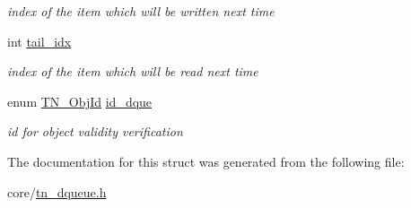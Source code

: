 \begin{DoxyCompactItemize}
\begin{DoxyCompactList}\small\item\em index of the item which will be written next time \end{DoxyCompactList}\item 
\hypertarget{structTN__DQueue_ab5451b7c143d4208c36d4227b79732a0}{int \hyperlink{structTN__DQueue_ab5451b7c143d4208c36d4227b79732a0}{tail\+\_\+idx}}\label{structTN__DQueue_ab5451b7c143d4208c36d4227b79732a0}

\begin{DoxyCompactList}\small\item\em index of the item which will be read next time \end{DoxyCompactList}\item 
\hypertarget{structTN__DQueue_afce2b73b8afc3b1537e34ff3a4a7114c}{enum \hyperlink{tn__common_8h_ae779dd1f6735f6e139fb70acd004d976}{T\+N\+\_\+\+Obj\+Id} \hyperlink{structTN__DQueue_afce2b73b8afc3b1537e34ff3a4a7114c}{id\+\_\+dque}}\label{structTN__DQueue_afce2b73b8afc3b1537e34ff3a4a7114c}

\begin{DoxyCompactList}\small\item\em id for object validity verification \end{DoxyCompactList}\end{DoxyCompactItemize}


The documentation for this struct was generated from the following file\+:\begin{DoxyCompactItemize}
\item 
core/\hyperlink{tn__dqueue_8h}{tn\+\_\+dqueue.\+h}\end{DoxyCompactItemize}
